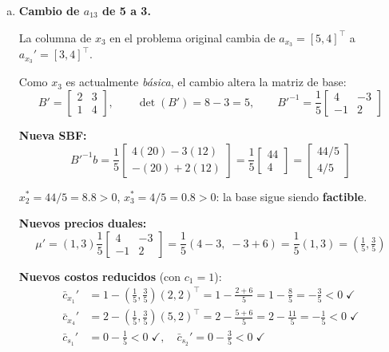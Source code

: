 \documentclass{article}
\begin{document}
\begin{enumerate}[a)]
Costos reducidos: $\bar{c}_{x_3}=-1<0$, $\bar{c}_{x_4}=0$, $\bar{c}_{s_1}=0$, $\bar{c}_{s_2}=-1<0$. Todos $\leq0$: \textbf{óptimo}. \checkmark

\textbf{Nueva solución:} $x_1^*=2$, $x_2^*=8$, $x_3^*=0$, $x_4^*=0$, $Z^*=12$.

\textit{Nota:} $\bar{c}_{x_4}=\bar{c}_{s_1}=0$ indica \textbf{soluciones múltiples}: $x_4$ y $s_1$ pueden entrar sin cambiar $Z$.

\item \textbf{Cambio de $a_{13}$ de 5 a 3.}

La columna de $x_3$ en el problema original cambia de $a_{x_3}=[5,4]^\top$ a $a_{x_3}'=[3,4]^\top$.

Como $x_3$ es actualmente \emph{básica}, el cambio altera la matriz de base:
$$B'=\begin{bmatrix}2&3\\1&4\end{bmatrix},\qquad\det(B')=8-3=5,\qquad B'^{-1}=\frac{1}{5}\begin{bmatrix}4&-3\\-1&2\end{bmatrix}$$

\textbf{Nueva SBF:}
$$B'^{-1}b=\frac{1}{5}\begin{bmatrix}4(20)-3(12)\\-(20)+2(12)\end{bmatrix}=\frac{1}{5}\begin{bmatrix}44\\4\end{bmatrix}=\begin{bmatrix}44/5\\4/5\end{bmatrix}$$

$x_2^*=44/5=8.8>0$, $x_3^*=4/5=0.8>0$: la base sigue siendo \textbf{factible}. \checkmark

\textbf{Nuevos precios duales:}
$$\mu'=(1,3)\frac{1}{5}\begin{bmatrix}4&-3\\-1&2\end{bmatrix}=\frac{1}{5}(4-3,\;-3+6)=\frac{1}{5}(1,3)=\left(\tfrac{1}{5},\tfrac{3}{5}\right)$$

\textbf{Nuevos costos reducidos} (con $c_1=1$):
\begin{align*}
\bar{c}_{x_1}'&=1-\left(\tfrac{1}{5},\tfrac{3}{5}\right)(2,2)^\top=1-\tfrac{2+6}{5}=1-\tfrac{8}{5}=-\tfrac{3}{5}<0\;\checkmark\\
\bar{c}_{x_4}'&=2-\left(\tfrac{1}{5},\tfrac{3}{5}\right)(5,2)^\top=2-\tfrac{5+6}{5}=2-\tfrac{11}{5}=-\tfrac{1}{5}<0\;\checkmark\\
\bar{c}_{s_1}'&=0-\tfrac{1}{5}<0\;\checkmark,\quad\bar{c}_{s_2}'=0-\tfrac{3}{5}<0\;\checkmark
\end{align*}


\end{enumerate}
\end{document}
